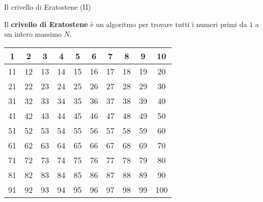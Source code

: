 \begin{frame}{Il crivello di Eratostene (II)}

  Il \textbf{crivello di Eratostene} è un algoritmo per trovare
  tutti i numeri primi da $1$ a un intero massimo $N$.

  \begin{table}[]
  \centering
    \begin{tabular}{|c|c|c|c|c|c|c|c|c|c|}
      \hline
      \cellcolor[HTML]{C0C0C0}1  & 2  & 3  & 4  & 5  & 6  & 7  & 8  & 9  & 10  \\ \hline
      11                         & 12 & 13 & 14 & 15 & 16 & 17 & 18 & 19 & 20  \\ \hline
      21                         & 22 & 23 & 24 & 25 & 26 & 27 & 28 & 29 & 30  \\ \hline
      31                         & 32 & 33 & 34 & 35 & 36 & 37 & 38 & 39 & 40  \\ \hline
      41                         & 42 & 43 & 44 & 45 & 46 & 47 & 48 & 49 & 50  \\ \hline
      51                         & 52 & 53 & 54 & 55 & 56 & 57 & 58 & 59 & 60  \\ \hline
      61                         & 62 & 63 & 64 & 65 & 66 & 67 & 68 & 69 & 70  \\ \hline
      71                         & 72 & 73 & 74 & 75 & 76 & 77 & 78 & 79 & 80  \\ \hline
      81                         & 82 & 83 & 84 & 85 & 86 & 87 & 88 & 89 & 90  \\ \hline
      91                         & 92 & 93 & 94 & 95 & 96 & 97 & 98 & 99 & 100 \\ \hline
    \end{tabular}
  \end{table}

\end{frame}

